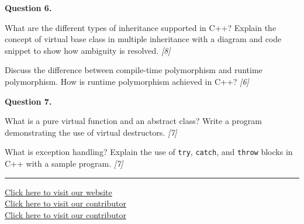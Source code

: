 \documentclass[11pt,a4paper]{article}
\newcommand{\pts}[1]{\hfill   \textit{[#1]}}
\begin{document}
\medskip


\noindent   \textbf{Question 6.}

\begin{parts}
  \item What are the different types of inheritance supported in C++? Explain the concept of virtual base class in multiple inheritance with a diagram and code snippet to show how ambiguity is resolved. \pts{8}
  \item Discuss the difference between compile-time polymorphism and runtime polymorphism. How is runtime polymorphism achieved in C++? \pts{6}
\end{parts}

\medskip


\noindent   \textbf{Question 7.}

\begin{parts}
  \item What is a pure virtual function and an abstract class? Write a program demonstrating the use of virtual destructors. \pts{7}
  \item What is exception handling? Explain the use of   \texttt{try},   \texttt{catch}, and   \texttt{throw} blocks in C++ with a sample program. \pts{7}
\end{parts}

\vfill
\rule{\linewidth}{0.4pt}

\begin{center}\small
\href{https://bhu-exam.vercel.app/}{Click here to visit our website}\\[4pt]\href{https://me-aryan.vercel.app/}{Click here to visit our contributor}\\[4pt]\href{https://quashan-me.vercel.app/}{Click here to visit our contributor}
\end{center}
\end{document}
